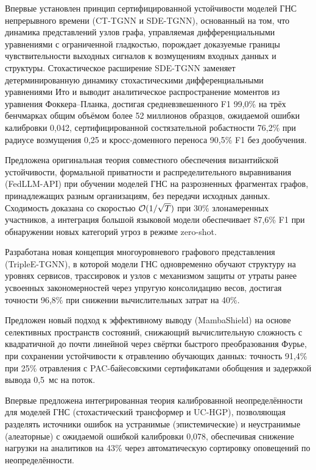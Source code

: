 Впервые установлен принцип сертифицированной устойчивости моделей ГНС непрерывного времени (CT-TGNN и SDE-TGNN), основанный на том, что динамика представлений узлов графа, управляемая дифференциальными уравнениями с ограниченной гладкостью, порождает доказуемые границы чувствительности выходных сигналов к возмущениям входных данных и структуры. Стохастическое расширение SDE-TGNN заменяет детерминированную динамику стохастическими дифференциальными уравнениями Ито и выводит аналитическое распространение моментов из уравнения Фоккера--Планка, достигая средневзвешенного F1 99,0\% на трёх бенчмарках общим объёмом более 52 миллионов образцов, ожидаемой ошибки калибровки 0,042, сертифицированной состязательной робастности 76,2\% при радиусе возмущения 0,25 и кросс-доменного переноса 90,5\% F1 без дообучения.

Предложена оригинальная теория совместного обеспечения византийской устойчивости, формальной приватности и распределительного выравнивания (FedLLM-API) при обучении моделей ГНС на разрозненных фрагментах графов, принадлежащих разным организациям, без передачи исходных данных. Сходимость доказана со скоростью $\mathcal{O}(1/\sqrt{T})$ при 30\% злонамеренных участников, а интеграция большой языковой модели обеспечивает 87,6\% F1 при обнаружении новых категорий угроз в режиме zero-shot.

Разработана новая концепция многоуровневого графового представления (TripleE-TGNN), в которой модели ГНС одновременно обучают структуру на уровнях сервисов, трассировок и узлов с механизмом защиты от утраты ранее усвоенных закономерностей через упругую консолидацию весов, достигая точности 96,8\% при снижении вычислительных затрат на 40\%.

Предложен новый подход к эффективному выводу (MambaShield) на основе селективных пространств состояний, снижающий вычислительную сложность с квадратичной до почти линейной через свёртки быстрого преобразования Фурье, при сохранении устойчивости к отравлению обучающих данных: точность 91,4\% при 25\% отравления с PAC-байесовскими сертификатами обобщения и задержкой вывода 0,5~мс на поток.

Впервые предложена интегрированная теория калиброванной неопределённости для моделей ГНС (стохастический трансформер и UC-HGP), позволяющая разделять источники ошибок на устранимые (эпистемические) и неустранимые (алеаторные) с ожидаемой ошибкой калибровки 0,078, обеспечивая снижение нагрузки на аналитиков на 43\% через автоматическую сортировку оповещений по неопределённости.


